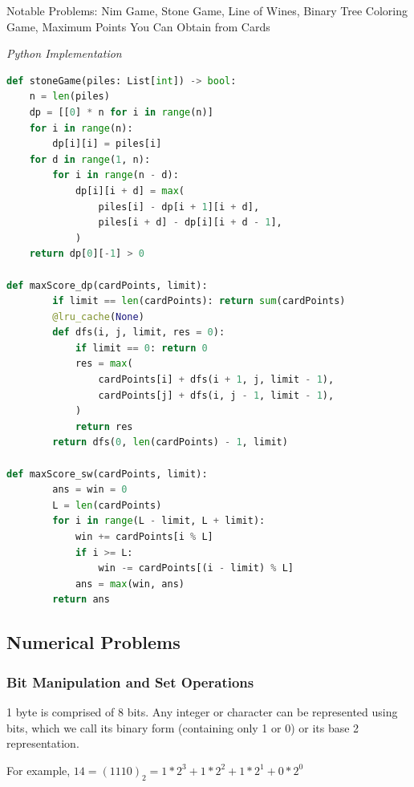 \documentclass{article}
\begin{document}
Notable Problems: Nim Game, Stone Game, Line of Wines, Binary Tree Coloring Game, Maximum Points You Can Obtain from Cards

\vspace{8pt} \emph{Python Implementation}
\begin{lstlisting}[language=Python]
def stoneGame(piles: List[int]) -> bool:
    n = len(piles)
    dp = [[0] * n for i in range(n)]
    for i in range(n):
        dp[i][i] = piles[i]
    for d in range(1, n):
        for i in range(n - d):
            dp[i][i + d] = max(
                piles[i] - dp[i + 1][i + d],
                piles[i + d] - dp[i][i + d - 1],
            )
    return dp[0][-1] > 0

def maxScore_dp(cardPoints, limit):
        if limit == len(cardPoints): return sum(cardPoints)
        @lru_cache(None)
        def dfs(i, j, limit, res = 0):
            if limit == 0: return 0
            res = max(
                cardPoints[i] + dfs(i + 1, j, limit - 1), 
                cardPoints[j] + dfs(i, j - 1, limit - 1),
            )
            return res
        return dfs(0, len(cardPoints) - 1, limit)
        
def maxScore_sw(cardPoints, limit):
        ans = win = 0
        L = len(cardPoints)
        for i in range(L - limit, L + limit):
            win += cardPoints[i % L]
            if i >= L:
                win -= cardPoints[(i - limit) % L]
            ans = max(win, ans)    
        return ans
\end{lstlisting}

    \subsection{Numerical Problems}
    
    \subsubsection{Bit Manipulation and Set Operations}
    1 byte is comprised of 8 bits. Any integer or character can be represented using bits, which we call its binary form (containing only 1 or 0) or its base 2 representation.
    
    For example, $14 = (1110)_2 = 1 * 2^3 + 1 * 2^2 + 1 * 2^1 + 0 * 2^0$  
    
\end{document}
